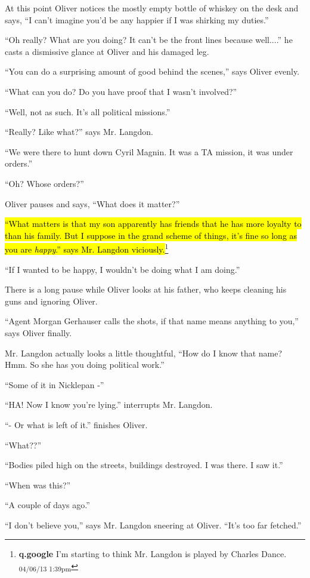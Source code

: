 At this point Oliver notices the mostly empty bottle of whiskey on the desk and says, ``I can't imagine you'd be any happier if I was shirking my duties.''

``Oh really? What are you doing?  It can't be the front lines because well....'' he casts a dismissive glance at Oliver and his damaged leg. 

``You can do a surprising amount of good behind the scenes,'' says Oliver evenly.

``What can you do?  Do you have proof that I wasn't involved?''

``Well, not as such.  It's all political missions.''

``Really?  Like what?'' says Mr. Langdon.

``We were there to hunt down Cyril Magnin.  It was a TA mission, it was under orders.''

``Oh?  Whose orders?''

Oliver pauses and says, ``What does it matter?''

\hl{``What matters is that my son apparently has friends that he has more loyalty to than his family.  But I suppose in the grand scheme of things, it's fine so long as you are \textit{happy}.'' says Mr. Langdon viciously.}\footnote{\textbf{q.google }I'm starting to think Mr. Langdon is played by Charles Dance. \textsubscript{04/06/13 1:39pm}}

``If I wanted to be happy, I wouldn't be doing what I am doing.''

There is a long pause while Oliver looks at his father, who keeps cleaning his guns and ignoring Oliver.

``Agent Morgan Gerhauser calls the shots, if that name means anything to you,'' says Oliver finally.

Mr. Langdon actually looks a little thoughtful, ``How do I know that name?  Hmm. So she has you doing political work.''

``Some of it in Nicklepan -''

``HA!  Now I know you're lying.'' interrupts Mr. Langdon.

``- Or what is left of it.'' finishes Oliver.

``What??''

``Bodies piled high on the streets, buildings destroyed.  I was there.  I saw it.''

``When was this?''

``A couple of days ago.''

``I don't believe you,'' says Mr. Langdon sneering at Oliver.  ``It's too far fetched.''

